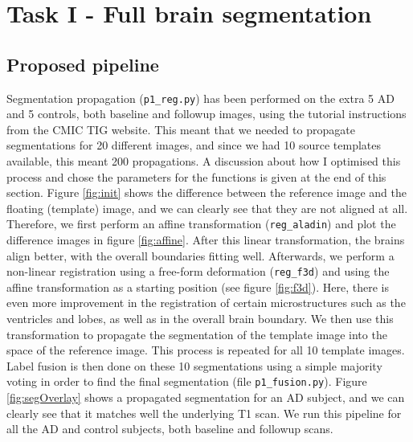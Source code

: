 \documentclass[11pt,a4paper,oneside]{report}
\begin{document}

\section*{Task I - Full brain segmentation}

\subsection*{Proposed pipeline}

Segmentation propagation (\texttt{p1\_reg.py}) has been performed on the extra 5 AD and 5 controls, both baseline and followup images, using the tutorial instructions from the CMIC TIG website. This meant that we needed to propagate segmentations for 20 different images, and since we had 10 source templates available, this meant 200 propagations. A discussion about how I optimised this process and chose the parameters for the functions is given at the end of this section. Figure \ref{fig:init} shows the difference between the reference image and the floating (template) image, and we can clearly see that they are not aligned at all. Therefore, we first perform an affine transformation (\texttt{reg\_aladin}) and plot the difference images in figure \ref{fig:affine}. After this linear transformation, the brains align better, with the overall boundaries fitting well. Afterwards, we perform a non-linear registration using a free-form deformation (\texttt{reg\_f3d}) and using the affine transformation as a starting position (see figure \ref{fig:f3d}). Here, there is even more improvement in the registration of certain microstructures such as the ventricles and lobes, as well as in the overall brain boundary. We then use this transformation to propagate the segmentation of the template image into the space of the reference image. This process is repeated for all 10 template images. Label fusion is then done on these 10 segmentations using a simple majority voting in order to find the final segmentation (file \texttt{p1\_fusion.py}). Figure \ref{fig:segOverlay} shows a propagated segmentation for an AD subject, and we can clearly see that it matches well the underlying T1 scan. We run this pipeline for all the AD and control subjects, both baseline and followup scans.
\end{document}
